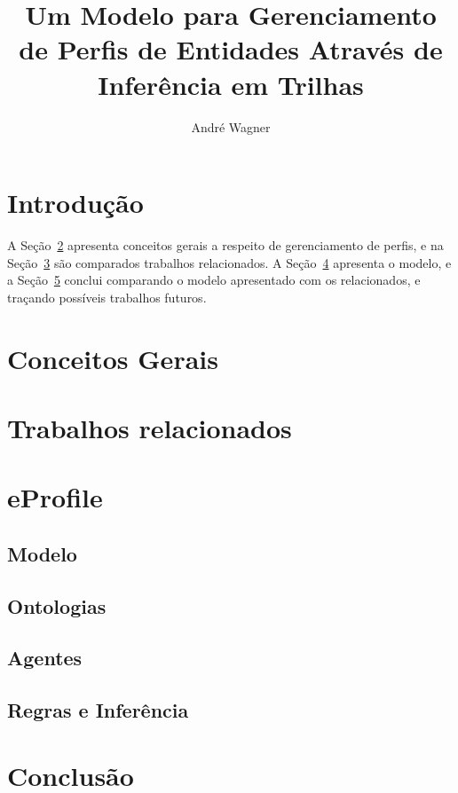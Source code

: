 \documentclass[a4paper,twocolumn]{article}
\author{André Wagner}
\title{Um Modelo para Gerenciamento de Perfis de Entidades Através de Inferência em Trilhas}
\date{}
\begin{document}
\maketitle

\section{Introdução}
\label{sec:introducao}


A Seção~\ref{sec:conceitos} apresenta conceitos gerais a respeito de gerenciamento de perfis, e na Seção~\ref{sec:relacionados} são comparados trabalhos relacionados. A Seção~\ref{sec:eprofile} apresenta o modelo, e a Seção~\ref{sec:conclusao} conclui comparando o modelo apresentado com os relacionados, e traçando possíveis trabalhos futuros.

\section{Conceitos Gerais}
\label{sec:conceitos}


\section{Trabalhos relacionados}
\label{sec:relacionados}


\section{eProfile}
\label{sec:eprofile}


  \subsection{Modelo}
  \label{sec:modelo}
  

  \subsection{Ontologias}
  \label{sec:ontologias}
  

  \subsection{Agentes}
  \label{sec:agentes}
  

  \subsection{Regras e Inferência}
  \label{sec:inferencia}
  

\section{Conclusão}
\label{sec:conclusao}


%



\begin{small}
  
\end{small}
\end{document}

